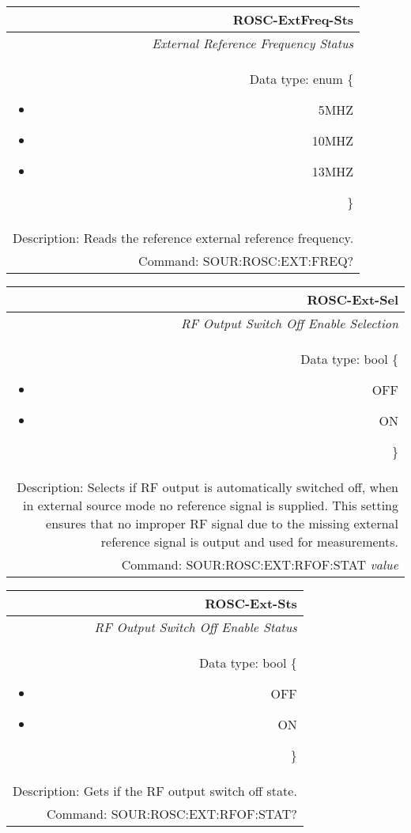 \documentclass[openany]{article}
\begin{document}
		\begin{tabular}{N}
			\hline
			\bfseries ROSC-ExtFreq-Sts \\ \hline
			\emph{External Reference Frequency Status} \\
			Data type: enum \{\begin{itemize}[noitemsep]
				\small
				\item[] 5MHZ
				\item[] 10MHZ
				\item[] 13MHZ
			\end{itemize}\} \\ 
			Description: Reads the reference external reference frequency. \\
			Command: SOUR:ROSC:EXT:FREQ? \\

		\end{tabular}
%
		\begin{tabular}{N}
			\hline
			\bfseries ROSC-Ext-Sel \\ \hline
			\emph{RF Output Switch Off Enable Selection} \\
			Data type: bool \{\begin{itemize}[noitemsep]
				\small
				\item[] OFF
				\item[] ON
			\end{itemize}\} \\
			Description: Selects if RF output is automatically switched off, when in external source mode no reference signal is supplied. This setting ensures that no improper RF signal due to the missing external reference signal is output and used for measurements. \\
			Command: SOUR:ROSC:EXT:RFOF:STAT \emph{value} \\

		\end{tabular}


		\begin{tabular}{N}
			\hline
			\bfseries ROSC-Ext-Sts \\ \hline
			\emph{RF Output Switch Off Enable Status} \\
			Data type: bool \{\begin{itemize}[noitemsep]
				\small
				\item[] OFF
				\item[] ON
			\end{itemize}\} \\
			Description: Gets if the RF output switch off state. \\
			Command: SOUR:ROSC:EXT:RFOF:STAT? \\
			
		\end{tabular}
%
\end{document}

